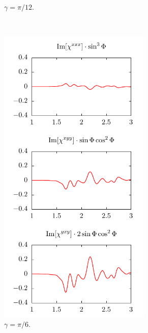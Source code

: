 \documentclass[aps,prb,10pt,letterpaper,notitlepage]{revtex4-1}
\begin{document}
\begin{figure}[b]
\begin{subfigure}[b]{0.25\textwidth}
        \caption{$\gamma = \pi/12$.}
    \end{subfigure}
    ~ 
    \begin{subfigure}[b]{0.25\textwidth}
        \includegraphics[width=0.8\textwidth]{rot/comps30.pdf}
        \caption{$\gamma = \pi/6$.}
    \end{subfigure}
    ~ 
    \begin{subfigure}[b]{0.25\textwidth}

\end{subfigure}
\end{figure}
\end{document}
